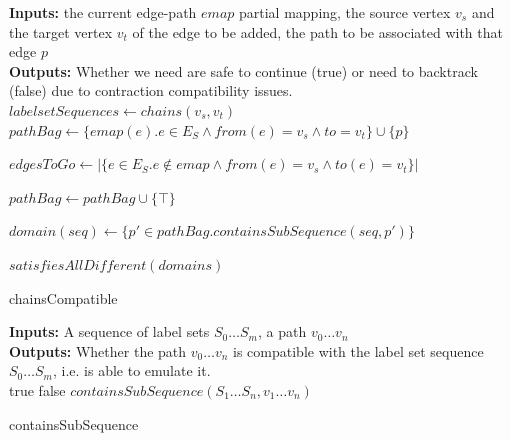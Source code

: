 \begin{algorithm}
\color{purple}
\SetAlgoLined
\LinesNumbered
\textbf{Inputs: } the current edge-path $\mathit{emap}$ partial mapping, the source vertex $v_s$ and the target vertex $v_t$ of the edge to be added, the path to be associated with that edge $p$\\
\textbf{Outputs: } Whether we need are safe to continue (true) or need to backtrack (false) due to contraction compatibility issues.\\
$\mathit{labelsetSequences} \longleftarrow \mathit{chains}(v_s, v_t)$\;
$\mathit{pathBag} \longleftarrow \{\mathit{emap}(e) . e \in E_S \land \mathit{from}(e)=v_s \land \mathit{to}=v_t \} \cup \{p\}$\;

$\mathit{edgesToGo} \longleftarrow |\{e \in E_S . e \not \in \mathit{emap} \land \mathit{from}(e)=v_s \land \mathit{to}(e)=v_t\}|$

 {
		$\mathit{pathBag}\longleftarrow \mathit{pathBag} \cup \{\top\}$\;	
}

 {
	$\mathit{domain}(\mathit{seq})\longleftarrow \{p' \in \mathit{pathBag} . \mathit{containsSubSequence}(\mathit{seq}, p')\}$\;
}

\Return $\mathit{satisfiesAllDifferent}(\mathit{domains})$\;

 \caption{chainsCompatible}
 \label{algorithm:chainsCompatible}
\end{algorithm}


\begin{algorithm}
\color{purple}
\SetAlgoLined
\LinesNumbered
\textbf{Inputs: } A sequence of label sets $S_0 \dots S_m$, a path $v_0 \dots v_n$\\
\textbf{Outputs: } Whether the path $v_0 \dots v_n$ is compatible with the label set sequence $S_0 \dots S_m$, i.e. is able to emulate it.\\
  {
	\Return true\;
}  {
	\Return false\;
}  {
	\Return $\mathit{containsSubSequence}(S_1 \dots S_n, v_1 \dots v_n)$\;
} 
 \caption{containsSubSequence}
 \label{algorithm:containsSubSequence}
\end{algorithm}

